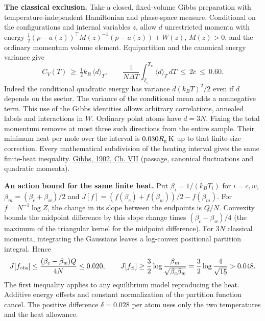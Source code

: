 \documentclass[11pt,a4paper]{article}
\begin{document}
\textbf{The classical exclusion.} Take a closed, fixed-volume Gibbs
preparation with temperature-independent Hamiltonian and phase-space
measure. Conditional on the configurations and internal variables \(z\),
allow \(d\) unrestricted momenta with energy
\(\tfrac12(p-a(z))^\top M(z)^{-1}(p-a(z))+W(z)\), \(M(z)>0\), and the
ordinary momentum volume element. Equipartition and the canonical energy
variance give \[
 C_V(T)\ \ge\ \tfrac12 k_B\,\langle d\rangle_T,\qquad
 \frac{1}{N\Delta T}\int_{T_c}^{T_w}\langle d\rangle_T\,dT
       \ \le\ 2\bar c\ \le\ 0.60 .
\] Indeed the conditional quadratic energy has variance \(d(k_BT)^2/2\)
even if \(d\) depends on the sector. The variance of the conditional
mean adds a nonnegative term. This use of the Gibbs identities allows
arbitrary correlations, annealed labels and interactions in \(W\).
Ordinary point atoms have \(d=3N\). Fixing the total momentum removes at
most three such directions from the entire sample. Their minimum heat
per mole over the interval is \(0.030 R_{\rm g}\,{\rm K}\) up to that
finite-size correction. Every mathematical subdivision of the heating
interval gives the same finite-heat inequality.
\href{https://en.wikisource.org/wiki/Elementary_Principles_in_Statistical_Mechanics/Chapter_VII}{Gibbs,
1902, Ch. VII} (passage, canonical fluctuations and quadratic momenta).

\textbf{An action bound for the same finite heat.} Put
\(\beta_i=1/(k_BT_i)\) for \(i=c,w\), \(\beta_m=(\beta_c+\beta_w)/2\)
and \(J[f]=(f(\beta_c)+f(\beta_w))/2-f(\beta_m)\). For
\(f=N^{-1}\log Z\), the change in its slope between the endpoints is
\(Q/N\). Convexity bounds the midpoint difference by this slope change
times \((\beta_c-\beta_w)/4\) (the maximum of the triangular kernel for
the midpoint difference). For \(3N\) classical momenta, integrating the
Gaussians leaves a log-convex positional partition integral. Hence \[
 J[f_{\rm obs}]\le\frac{(\beta_c-\beta_w)Q}{4N}\le0.020,\qquad
 J[f_{\rm cl}]\ge\frac32\log
   \frac{\beta_m}{\sqrt{\beta_c\beta_w}}
   =\frac32\log\frac4{\sqrt{15}}>0.048 .
\] The first inequality applies to any equilibrium model reproducing the
heat. Additive energy offsets and constant normalization of the
partition function cancel. The positive difference \(\delta=0.028\) per
atom uses only the two temperatures and the heat allowance.
\end{document}
